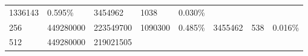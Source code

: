 \documentclass[11pt]{article}
\begin{document}
\begin{longtable}[]{@{}llllllll@{}}
\begin{minipage}[t]{0.09\columnwidth}
1336143\strut
\end{minipage} & \begin{minipage}[t]{0.09\columnwidth}\raggedright\strut
0.595\%\strut
\end{minipage} & \begin{minipage}[t]{0.09\columnwidth}\raggedright\strut
3454962\strut
\end{minipage} & \begin{minipage}[t]{0.10\columnwidth}\raggedright\strut
1038\strut
\end{minipage} & \begin{minipage}[t]{0.10\columnwidth}\raggedright\strut
0.030\%\strut
\end{minipage}\tabularnewline
\begin{minipage}[t]{0.14\columnwidth}\raggedright\strut
256\strut
\end{minipage} & \begin{minipage}[t]{0.10\columnwidth}\raggedright\strut
449280000\strut
\end{minipage} & \begin{minipage}[t]{0.08\columnwidth}\raggedright\strut
223549700\strut
\end{minipage} & \begin{minipage}[t]{0.09\columnwidth}\raggedright\strut
1090300\strut
\end{minipage} & \begin{minipage}[t]{0.09\columnwidth}\raggedright\strut
0.485\%\strut
\end{minipage} & \begin{minipage}[t]{0.09\columnwidth}\raggedright\strut
3455462\strut
\end{minipage} & \begin{minipage}[t]{0.10\columnwidth}\raggedright\strut
538\strut
\end{minipage} & \begin{minipage}[t]{0.10\columnwidth}\raggedright\strut
0.016\%\strut
\end{minipage}\tabularnewline
\begin{minipage}[t]{0.14\columnwidth}\raggedright\strut
512\strut
\end{minipage} & \begin{minipage}[t]{0.10\columnwidth}\raggedright\strut
449280000\strut
\end{minipage} & \begin{minipage}[t]{0.08\columnwidth}\raggedright\strut
219021505\strut
\end{minipage} & \begin{minipage}[t]{0.09\columnwidth}\raggedright\strut

\end{minipage}
\end{longtable}
\end{document}
